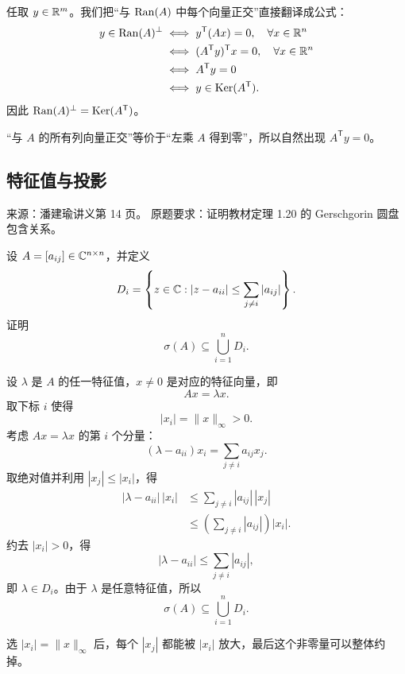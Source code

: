 \begin{solution}
任取 $y\in\mathbb{R}^m$。我们把“与 $\operatorname{Ran}(A)$ 中每个向量正交”直接翻译成公式：
\begin{align*}
y\in\operatorname{Ran}(A)^\perp
&\iff y^{\mathsf T}(Ax)=0,\quad \forall x\in\mathbb{R}^n\\
&\iff (A^{\mathsf T}y)^{\mathsf T}x=0,\quad \forall x\in\mathbb{R}^n\\
&\iff A^{\mathsf T}y=0\\
&\iff y\in\operatorname{Ker}(A^{\mathsf T}).
\end{align*}
因此 $\operatorname{Ran}(A)^\perp=\operatorname{Ker}(A^{\mathsf T})$。
\end{solution}

\begin{dxtips}[一句话记住]\label{hw:matrix:tip3}
“与 $A$ 的所有列向量正交”等价于“左乘 $A$ 得到零”，所以自然出现 $A^{\mathsf T}y=0$。
\end{dxtips}

\subsection*{特征值与投影}

\begin{homework}
\par\smallskip\textsf{来源：潘建瑜讲义第 14 页。}
原题要求：证明教材定理 1.20 的 Gerschgorin 圆盘包含关系。\par\smallskip

设 $A=[a_{ij}]\in\mathbb{C}^{n\times n}$，并定义
\[
D_i=\left\{z\in\mathbb{C}:
|z-a_{ii}|\le\sum_{j\ne i}|a_{ij}|
\right\}.
\]
证明
\[
\sigma(A)\subseteq\bigcup_{i=1}^n D_i.
\]
\end{homework}

\begin{solution}
设 $\lambda$ 是 $A$ 的任一特征值，$x\ne0$ 是对应的特征向量，即
\[
Ax=\lambda x.
\]
取下标 $i$ 使得
\[
|x_i|=\|x\|_\infty>0.
\]
考虑 $Ax=\lambda x$ 的第 $i$ 个分量：
\[
(\lambda-a_{ii})x_i=
\sum_{j\ne i}a_{ij}x_j.
\]
取绝对值并利用 $|x_j|\le |x_i|$，得
\begin{align*}
|\lambda-a_{ii}|\,|x_i|
&\le\sum_{j\ne i}|a_{ij}|\,|x_j|\\
&\le\left(\sum_{j\ne i}|a_{ij}|\right)|x_i|.
\end{align*}
约去 $|x_i|>0$，得
\[
|\lambda-a_{ii}|\le\sum_{j\ne i}|a_{ij}|,
\]
即 $\lambda\in D_i$。由于 $\lambda$ 是任意特征值，所以
\[
\sigma(A)\subseteq\bigcup_{i=1}^nD_i.
\]
\end{solution}

\begin{dxtips}[为什么要选最大分量]\label{hw:matrix:tip4}
选 $|x_i|=\|x\|_\infty$ 后，每个 $|x_j|$ 都能被 $|x_i|$ 放大，最后这个非零量可以整体约掉。
\end{dxtips}

